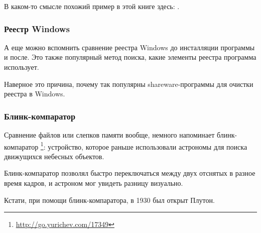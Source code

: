 В каком-то смысле похожий пример в этой книге здесь: .


\subsubsection{Реестр Windows}

А еще можно вспомнить сравнение реестра Windows до инсталляции программы и после.
Это также популярный метод поиска, какие элементы реестра программа использует.

Наверное это причина, почему так популярны shareware-программы для очистки реестра в Windows.

\subsubsection{Блинк-компаратор}

Сравнение файлов или слепков памяти вообще, немного напоминает блинк-компаратор
\footnote{\url{http://go.yurichev.com/17349}}:
устройство, которое раньше использовали астрономы для поиска движущихся небесных объектов.

Блинк-компаратор позволял быстро переключаться между двух отснятых в разное время кадров,
и астроном мог увидеть разницу визуально.

Кстати, при помощи блинк-компаратора, в 1930 был открыт Плутон.

